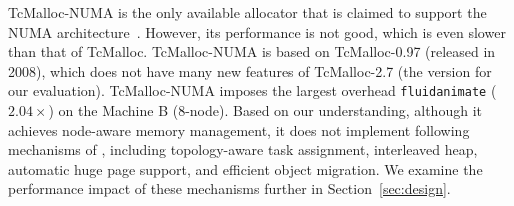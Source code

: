  TcMalloc-NUMA is the only available allocator that is claimed to support the NUMA architecture~\cite{tcmallocnew}. However, its performance is not good, which is even slower than that of TcMalloc. TcMalloc-NUMA is based on TcMalloc-0.97 (released in 2008), which does not have many new features of TcMalloc-2.7 (the version for our evaluation). TcMalloc-NUMA imposes the largest overhead \texttt{fluidanimate} ($2.04\times$) on the Machine B (8-node).  Based on our understanding, although it achieves node-aware memory management, it does not implement following mechanisms of \NM{}, including topology-aware task assignment, interleaved heap, automatic huge page support, and efficient object migration. We examine the performance impact of these mechanisms further in Section~\ref{sec:design}.    
  




